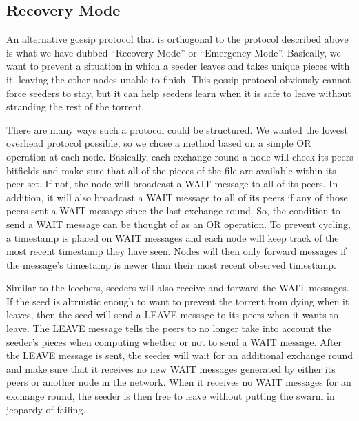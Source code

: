 %

\subsection{Recovery Mode}

An alternative gossip protocol that is orthogonal to the protocol described above is 
what we have dubbed ``Recovery Mode'' or ``Emergency Mode''. Basically, we
want to prevent a situation in which a seeder leaves and takes unique pieces
with it, leaving the other nodes unable to finish. This gossip protocol obviously
cannot force seeders to stay, but it can help seeders learn when it is safe to
leave without stranding the rest of the torrent. 

There are many ways such a protocol could be structured. We wanted the lowest
overhead protocol possible, so we chose a method based on a simple OR operation
at each node. Basically, each exchange round a node will check its peers bitfields
and make sure that all of the pieces of the file are available within its peer
set. If not, the node will broadcast a WAIT message to all of its peers. In addition, it will
also broadcast a WAIT message to all of its peers if any of those peers sent a 
WAIT message since the last exchange round. So, the condition to send a WAIT message 
can be thought of as an OR operation. To prevent cycling, a timestamp is placed
on WAIT messages and each node will keep track of the most recent timestamp they have seen. 
Nodes will then only forward messages if the message's timestamp is newer than their most 
recent observed timestamp.

Similar to the leechers, seeders will also receive and forward the WAIT messages. If the 
seed is altruistic enough to want to prevent the torrent from dying when it leaves,
then the seed will send a LEAVE message to its peers when it wants to leave. The LEAVE
message tells the peers to no longer take into account the seeder's pieces when computing
whether or not to send a WAIT message. After the LEAVE message is sent, the seeder will
wait for an additional exchange round and make sure that it receives no new WAIT messages
generated by either its peers or another node in the network. When it receives no WAIT
messages for an exchange round, the seeder is then free to leave without putting the 
swarm in jeopardy of failing. 

